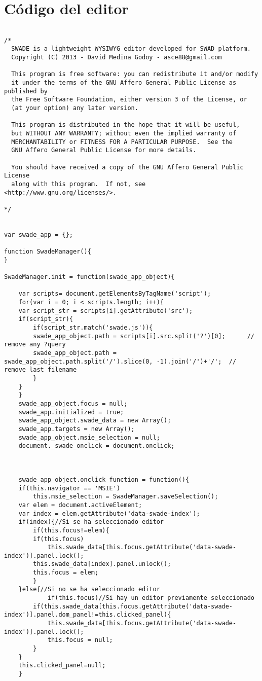 \chapter{Código del editor}
\begin{lstlisting}

/*
  SWADE is a lightweight WYSIWYG editor developed for SWAD platform.
  Copyright (C) 2013 - David Medina Godoy - asce88@gmail.com

  This program is free software: you can redistribute it and/or modify
  it under the terms of the GNU Affero General Public License as published by
  the Free Software Foundation, either version 3 of the License, or
  (at your option) any later version.

  This program is distributed in the hope that it will be useful,
  but WITHOUT ANY WARRANTY; without even the implied warranty of
  MERCHANTABILITY or FITNESS FOR A PARTICULAR PURPOSE.  See the
  GNU Affero General Public License for more details.

  You should have received a copy of the GNU Affero General Public License
  along with this program.  If not, see <http://www.gnu.org/licenses/>.

*/


var swade_app = {};

function SwadeManager(){
}

SwadeManager.init = function(swade_app_object){

    var scripts= document.getElementsByTagName('script');
    for(var i = 0; i < scripts.length; i++){
	var script_str = scripts[i].getAttribute('src');
	if(script_str){
	    if(script_str.match('swade.js')){
		swade_app_object.path = scripts[i].src.split('?')[0];      // remove any ?query
		swade_app_object.path = swade_app_object.path.split('/').slice(0, -1).join('/')+'/';  // remove last filename 
	    }
	}
    }
    swade_app_object.focus = null;
    swade_app.initialized = true;
    swade_app_object.swade_data = new Array();
    swade_app.targets = new Array();
    swade_app_object.msie_selection = null;
    document._swade_onclick = document.onclick;



    swade_app_object.onclick_function = function(){
	if(this.navigator == 'MSIE')
	    this.msie_selection = SwadeManager.saveSelection();
	var elem = document.activeElement;
	var index = elem.getAttribute('data-swade-index');
	if(index){//Si se ha seleccionado editor
	    if(this.focus!=elem){
		if(this.focus)
		    this.swade_data[this.focus.getAttribute('data-swade-index')].panel.lock();
		this.swade_data[index].panel.unlock();
		this.focus = elem;
	    }
	}else{//Si no se ha seleccionado editor
            if(this.focus)//Si hay un editor previamente seleccionado
		if(this.swade_data[this.focus.getAttribute('data-swade-index')].panel.dom_panel!=this.clicked_panel){ 
		    this.swade_data[this.focus.getAttribute('data-swade-index')].panel.lock();
		    this.focus = null;
		}
	}
	this.clicked_panel=null;
    }






\end{lstlisting}
